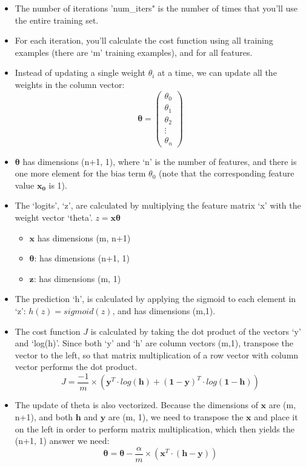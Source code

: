 \documentclass[11pt]{article}
\providecommand{\tightlist}{%
      \setlength{\itemsep}{0pt}\setlength{\parskip}{0pt}}
\begin{document}
\begin{itemize}
\tightlist
\item
  The number of iterations 'num\_iters" is the number of times that
  you'll use the entire training set.
\item
  For each iteration, you'll calculate the cost function using all
  training examples (there are `m' training examples), and for all
  features.
\item
  Instead of updating a single weight \(\theta_i\) at a time, we can
  update all the weights in the column vector:\\
  \[\mathbf{\theta} = \begin{pmatrix}
  \theta_0
  \\
  \theta_1
  \\ 
  \theta_2 
  \\ 
  \vdots
  \\ 
  \theta_n
  \end{pmatrix}\]
\item
  \(\mathbf{\theta}\) has dimensions (n+1, 1), where `n' is the number
  of features, and there is one more element for the bias term
  \(\theta_0\) (note that the corresponding feature value
  \(\mathbf{x_0}\) is 1).
\item
  The `logits', `z', are calculated by multiplying the feature matrix
  `x' with the weight vector `theta'. \(z = \mathbf{x}\mathbf{\theta}\)

  \begin{itemize}
  \tightlist
  \item
    \(\mathbf{x}\) has dimensions (m, n+1)
  \item
    \(\mathbf{\theta}\): has dimensions (n+1, 1)
  \item
    \(\mathbf{z}\): has dimensions (m, 1)
  \end{itemize}
\item
  The prediction `h', is calculated by applying the sigmoid to each
  element in `z': \(h(z) = sigmoid(z)\), and has dimensions (m,1).
\item
  The cost function \(J\) is calculated by taking the dot product of the
  vectors `y' and `log(h)'. Since both `y' and `h' are column vectors
  (m,1), transpose the vector to the left, so that matrix multiplication
  of a row vector with column vector performs the dot product.
  \[J = \frac{-1}{m} \times \left(\mathbf{y}^T \cdot log(\mathbf{h}) + \mathbf{(1-y)}^T \cdot log(\mathbf{1-h}) \right)\]
\item
  The update of theta is also vectorized. Because the dimensions of
  \(\mathbf{x}\) are (m, n+1), and both \(\mathbf{h}\) and
  \(\mathbf{y}\) are (m, 1), we need to transpose the \(\mathbf{x}\) and
  place it on the left in order to perform matrix multiplication, which
  then yields the (n+1, 1) answer we need:
  \[\mathbf{\theta} = \mathbf{\theta} - \frac{\alpha}{m} \times \left( \mathbf{x}^T \cdot \left( \mathbf{h-y} \right) \right)\]
\end{itemize}
\end{document}
